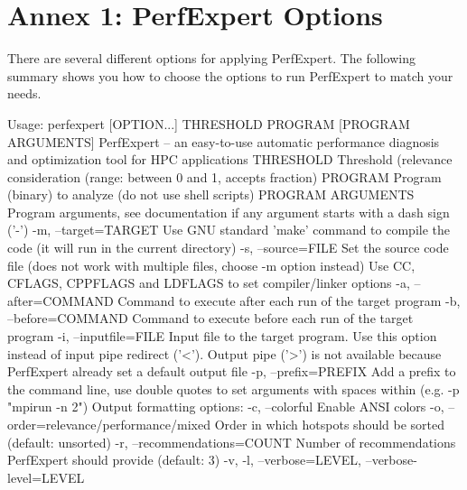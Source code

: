 \chapter{Annex 1: PerfExpert Options}
\label{ch:ch06_perfexpert_options}

There are several different options for applying PerfExpert. The following summary shows you how to choose the options to run PerfExpert to match your needs.

\begin{prompt}
Usage: perfexpert [OPTION...] THRESHOLD PROGRAM [PROGRAM ARGUMENTS]
PerfExpert -- an easy-to-use automatic performance diagnosis and optimization tool for HPC applications
 THRESHOLD           Threshold (relevance %
                     consideration (range: between 0 and 1, accepts fraction)
 PROGRAM             Program (binary) to analyze (do not use shell scripts)
 PROGRAM ARGUMENTS   Program arguments, see documentation if any argument
                     starts with a dash sign ('-')
 -m, --target=TARGET        Use GNU standard 'make' command to compile the
                            code (it will run in the current directory)
 -s, --source=FILE          Set the source code file (does not work with
                            multiple files, choose -m option instead)
Use CC, CFLAGS, CPPFLAGS and LDFLAGS to set compiler/linker options
 -a, --after=COMMAND        Command to execute after each run of the target
                            program
 -b, --before=COMMAND       Command to execute before each run of the target
                            program
 -i, --inputfile=FILE       Input file to the target program. Use this option
                            instead of input pipe redirect ('<'). Output pipe
                            ('>') is not available because PerfExpert already
                            set a default output file
 -p, --prefix=PREFIX        Add a prefix to the command line, use double
                            quotes to set arguments with spaces within (e.g.
                            -p "mpirun -n 2")
Output formatting options:
 -c, --colorful             Enable ANSI colors
 -o, --order=relevance/performance/mixed
                            Order in which hotspots should be sorted (default:
                            unsorted)
 -r, --recommendations=COUNT   Number of recommendations PerfExpert should
                            provide (default: 3)
 -v, -l, --verbose=LEVEL, --verbose-level=LEVEL

\end{prompt}
